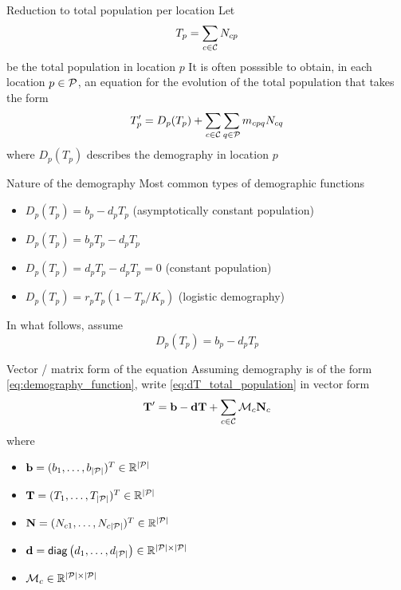 \documentclass[aspectratio=43]{beamer}
\begin{document}
\begin{frame}{Reduction to total population per location}
Let 
\[
	T_p = \sum_{c\in\C}N_{cp}
\]
be the total population in location $p$
\vfill
It is often posssible to obtain, in each location $p\in\P$, an equation for the evolution of the total population that takes the form
\begin{equation}\label{eq:dT_total_population}
	T_p' = 
	D_p(T_p)+\sum_{c\in\C}\sum_{q\in\P}m_{cpq}N_{cq}
\end{equation}
where $D_p(T_p)$ describes the demography in location $p$
\end{frame}

\begin{frame}{Nature of the demography}
	Most common types of demographic functions
	\begin{itemize}
		\item $D_p(T_p)=b_p-d_pT_p$ (asymptotically constant population)
		\item $D_p(T_p)=b_pT_p-d_pT_p$ 
		\item $D_p(T_p)=d_pT_p-d_pT_p=0$ (constant population)
		\item $D_p(T_p)=r_pT_p(1-T_p/K_p)$ (logistic demography)
	\end{itemize}
	\vfill
	In what follows, assume 
	\begin{equation}\label{eq:demography_function}
		D_p(T_p)=b_p-d_pT_p
	\end{equation}
\end{frame}

\begin{frame}{Vector / matrix form of the equation}
Assuming demography is of the form \eqref{eq:demography_function}, write \eqref{eq:dT_total_population} in vector form
\begin{equation}\label{sys:dN_general} 
	\mathbf{T}'=\mathbf{b}-\bd\bT+\sum_{c\in\C}\mathcal{M}_c\bN_{c}	
\end{equation}
where 
\begin{itemize}
	\item $\mathbf{b}=(b_1,\ldots,b_{|\mathcal{P}|})^T\in\IR^{|\P|}$
	\item $\mathbf{T}=(T_1,\ldots,T_{|\mathcal{P}|})^T\in\IR^{|\P|}$
	\item $\mathbf{N}=(N_{c1},\ldots,N_{c{|\mathcal{P}|}})^T\in\IR^{|\P|}$
	\item $\bd=\mathsf{diag}\left(d_1,\ldots,d_{|\mathcal{P}|}\right)\in\IR^{|\mathcal{P}|\times|\mathcal{P}|}$
	\item $\mathcal{M}_c\in\IR^{|\mathcal{P}|\times|\mathcal{P}|}$
\end{itemize}

\end{frame}
\end{document}
